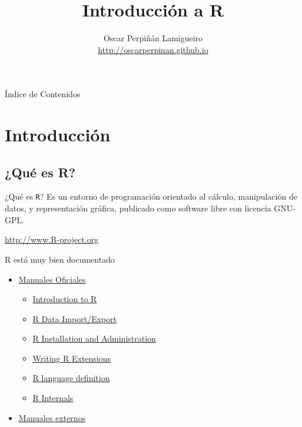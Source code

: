 \documentclass[xcolor={usenames,svgnames,dvipsnames}]{beamer}
\author{Oscar Perpiñán Lamigueiro \\ \url{http://oscarperpinan.github.io}}
\date{}
\title{Introducción a R}
\begin{document}
\maketitle

\begin{frame}[label={sec:org561738b}]{Índice de Contenidos}
\setcounter{tocdepth}{1}
\tableofcontents
\end{frame}

\section{Introducción}
\label{sec:orgef7c044}

\subsection{¿Qué es R?}
\label{sec:org0165145}
\begin{frame}[fragile,label={sec:orgada7ed2}]{¿Qué es \texttt{R}?}
 Es un entorno de programación orientado al cálculo, manipulación de datos, y representación gráfica, publicado como software libre con licencia GNU-GPL.
\begin{center}
\url{http://www.R-project.org} 
\end{center}
\end{frame}

\begin{frame}[label={sec:org4a99da9}]{R está muy bien documentado}
\begin{itemize}
\item \href{http://cran.r-project.org/manuals.html}{Manuales Oficiales}

\begin{itemize}
\item \href{http://cran.r-project.org/doc/manuals/r-release/R-intro.html}{Introduction to R}

\item \href{http://cran.r-project.org/doc/manuals/r-release/R-data.html}{R Data Import/Export}

\item \href{http://cran.r-project.org/doc/manuals/r-release/R-admin.html}{R Installation and Administration}

\item \href{http://cran.r-project.org/doc/manuals/r-release/R-exts.html}{Writing R Extensions}

\item \href{http://cran.r-project.org/doc/manuals/r-release/R-lang.html}{R language definition}

\item \href{http://cran.r-project.org/doc/manuals/r-release/R-ints.html}{R Internals}
\end{itemize}

\item \href{http://cran.r-project.org/other-docs.html}{Manuales externos}
\end{itemize}
\end{frame}
\end{document}
